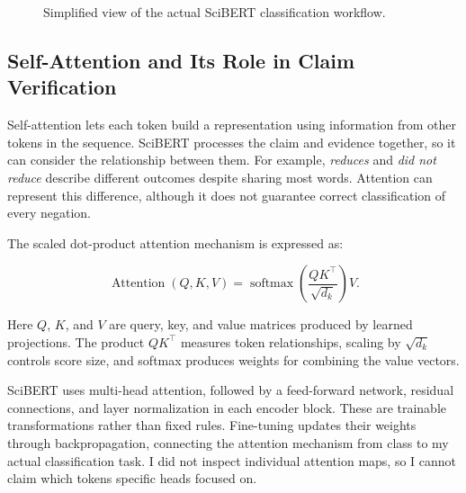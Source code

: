 \documentclass[11pt,letterpaper]{article}
\begin{document}
\begin{figure}[H]
\centering
{}
\caption{Simplified view of the actual SciBERT classification workflow.}
\end{figure}


\subsection{Self-Attention and Its Role in Claim Verification}

Self-attention lets each token build a representation using information from other tokens in the sequence. SciBERT processes the claim and evidence together, so it can consider the relationship between them. For example, \emph{reduces} and \emph{did not reduce} describe different outcomes despite sharing most words. Attention can represent this difference, although it does not guarantee correct classification of every negation.

The scaled dot-product attention mechanism is expressed as:

\begin{equation}
\operatorname{Attention}(Q,K,V)
=
\operatorname{softmax}
\left(
\frac{QK^\top}{\sqrt{d_k}}
\right)V.
\end{equation}

Here $Q$, $K$, and $V$ are query, key, and value matrices produced by learned projections. The product $QK^\top$ measures token relationships, scaling by $\sqrt{d_k}$ controls score size, and softmax produces weights for combining the value vectors.

SciBERT uses multi-head attention, followed by a feed-forward network, residual connections, and layer normalization in each encoder block. These are trainable transformations rather than fixed rules. Fine-tuning updates their weights through backpropagation, connecting the attention mechanism from class to my actual classification task. I did not inspect individual attention maps, so I cannot claim which tokens specific heads focused on.
\end{document}
